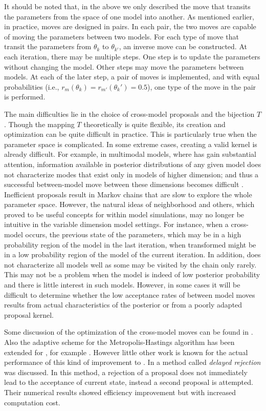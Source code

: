 It should be noted that, in the above we only described the move that
transits the parameters from the space of one model into another. As
mentioned earlier, in practice, \rjmcmc moves are designed in pairs. In each
pair, the two moves are capable of moving the parameters between two models.
For each type of move that transit the parameters from $\theta_k$ to
$\theta_{k'}$, an inverse move can be constructed. At each iteration, there
may be multiple steps. One step is to update the parameters without changing
the model. Other steps may move the parameters between models. At each of the
later step, a pair of moves is implemented, and with equal probabilities
(i.e., $r_m(\theta_k) = r_{m'}(\theta_k') = 0.5$), one type of the move in
the pair is performed.

The main difficulties lie in the choice of cross-model proposals and the
bijection $T$. Though the mapping $T$ theoretically is quite flexible, its
creation and optimization can be quite difficult in practice. This is
particularly true when the parameter space is complicated. In some extreme
cases, creating a valid kernel is already difficult. For example, in
multimodal models, where \rjmcmc has gain substantial attention, information
available in posterior distributions of any given model does not characterize
modes that exist only in models of higher dimension; and thus a successful
between-model move between these dimensions becomes difficult
\cite{Jasra:2007id}. Inefficient proposals result in Markov chains that are
slow to explore the whole parameter space. However, the natural ideas of
neighborhood and others, which proved to be useful concepts for within model
simulations, may no longer be intuitive in the variable dimension model
settings. For instance, when a cross-model occurs, the previous state of the
parameters, which may be in a high probability region of the model in the
last iteration, when transformed might be in a low probability region of the
model of the current iteration. In addition, \rjmcmc does not characterize
all models well as some may be visited by the chain only rarely. This may not
be a problem when the model is indeed of low posterior probability and there
is little interest in such models. However, in some cases it will be
difficult to determine whether the low acceptance rates of between model
moves results from actual characteristics of the posterior or from a poorly
adapted proposal kernel.

Some discussion of the optimization of the cross-model moves can be found in
\cite{Green:2009tr}. Also the adaptive scheme for the Metropolis-Hastings
algorithm has been extended for \rjmcmc, for example \cite{Hastie:2005vi}.
However little other work is known for the actual performance of this kind
of improvement to \rjmcmc. In \cite{Green:2001tk} a method called
\emph{delayed rejection} was discussed. In this method, a rejection of a
proposal does not immediately lead to the acceptance of current state,
instead a second proposal is attempted. Their numerical results showed
efficiency improvement but with increased computation cost.

